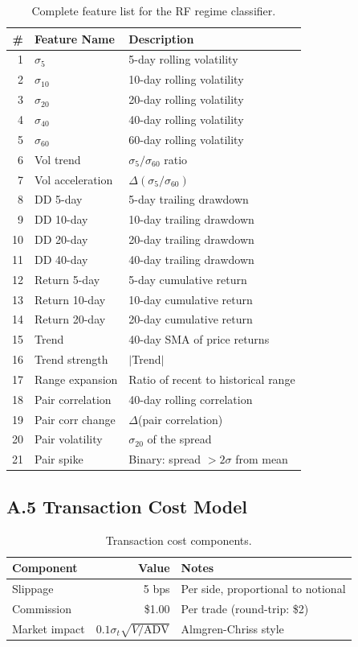 \documentclass[conference]{IEEEtran}
\begin{document}
\begin{table}[h]
\centering
\caption{Complete feature list for the RF regime classifier.}
\label{tab:supp_features}
\small
\begin{tabular}{rll}
\toprule
\# & Feature Name & Description \\
\midrule
1 & $\sigma_5$ & 5-day rolling volatility \\
2 & $\sigma_{10}$ & 10-day rolling volatility \\
3 & $\sigma_{20}$ & 20-day rolling volatility \\
4 & $\sigma_{40}$ & 40-day rolling volatility \\
5 & $\sigma_{60}$ & 60-day rolling volatility \\
6 & Vol trend & $\sigma_5 / \sigma_{60}$ ratio \\
7 & Vol acceleration & $\Delta(\sigma_5 / \sigma_{60})$ \\
8 & DD 5-day & 5-day trailing drawdown \\
9 & DD 10-day & 10-day trailing drawdown \\
10 & DD 20-day & 20-day trailing drawdown \\
11 & DD 40-day & 40-day trailing drawdown \\
12 & Return 5-day & 5-day cumulative return \\
13 & Return 10-day & 10-day cumulative return \\
14 & Return 20-day & 20-day cumulative return \\
15 & Trend & 40-day SMA of price returns \\
16 & Trend strength & $|$Trend$|$ \\
17 & Range expansion & Ratio of recent to historical range \\
18 & Pair correlation & 40-day rolling correlation \\
19 & Pair corr change & $\Delta$(pair correlation) \\
20 & Pair volatility & $\sigma_{20}$ of the spread \\
21 & Pair spike & Binary: spread $> 2\sigma$ from mean \\
\bottomrule
\end{tabular}
\end{table}

\subsection{A.5 Transaction Cost Model}

\begin{table}[h]
\centering
\caption{Transaction cost components.}
\label{tab:supp_costs}
\small
\begin{tabular}{lrl}
\toprule
Component & Value & Notes \\
\midrule
Slippage & 5 bps & Per side, proportional to notional \\
Commission & \$1.00 & Per trade (round-trip: \$2) \\
Market impact & $0.1 \sigma_t \sqrt{V/\text{ADV}}$ & Almgren-Chriss style \\
\bottomrule
\end{tabular}
\end{table}
\end{document}
